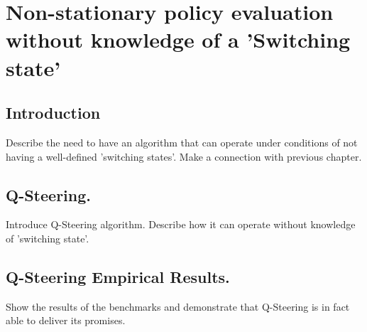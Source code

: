 \chapter{Non-stationary policy evaluation without knowledge of a 'Switching state'}

\section{Introduction}

Describe the need to have an algorithm that can operate under conditions of not having a well-defined 'switching states'. Make a connection with previous chapter.

\section{Q-Steering.}

Introduce Q-Steering algorithm. Describe how it can operate without knowledge of 'switching state'.

\section{Q-Steering Empirical Results.}

Show the results of the benchmarks and demonstrate that Q-Steering is in fact able to deliver its promises.




